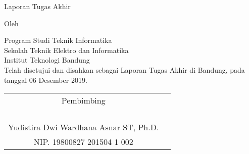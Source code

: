 \clearpage
\pagestyle{empty}

\begin{center}
\smallskip

    \Large \bfseries \MakeUppercase{\thetitle}
    \vfill

    \Large Laporan Tugas Akhir
    \vfill

    \large Oleh

    \Large \theauthor

    \large Program Studi Teknik Informatika \\
    Sekolah Teknik Elektro dan Informatika \\
    Institut Teknologi Bandung \\

    \vfill
    \normalsize \normalfont
    Telah disetujui dan disahkan sebagai Laporan Tugas Akhir di Bandung, pada tanggal 06 Desember 2019.

    \vfill
    \setlength{\tabcolsep}{12pt}
    \begin{tabular}{c@{\hskip 0in}c}
        Pembimbing\\
        & \\
        & \\
        & \\
        & \\
        Yudistira Dwi Wardhana Asnar ST, Ph.D. \\
        NIP. 19800827 201504 1 002 \\
    \end{tabular}

\end{center}
\clearpage
